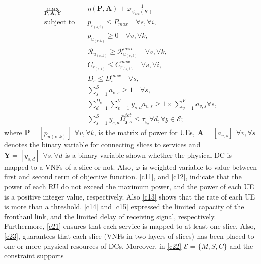 \documentclass[conference]{IEEEtran}
\begin{document}
\begin{subequations}
\begin{alignat}{4}
\max\limits_{\boldsymbol{P}, \boldsymbol{A}, \boldsymbol{Y} }   \quad &  \eta(\boldsymbol{P},\boldsymbol{A})+ \varphi \frac{1}{\psi_{tot}(\boldsymbol{Y})} \\
\text{subject to} \quad  & \bar{p}_{r_{(s,i)}} \leq P_{max} \quad \forall s, \forall i,
 \label{c11} \\
&p_{u_{(v,k)}}  \geq 0  \quad \forall v, \forall k,\label{c12} \\
&\mathcal{R}_{u_{(v,k)}} \geq  \mathcal{R}_{u_{(v,k)}}^{min} \quad \forall v, \forall k,\label{c13} \\
&C_{r_{(s,i)}} \leq C_{r_{(s,i)}}^{max} \quad \forall s, \forall i, \label{c14}\\
&D_{s} \leq D_{s}^{max} \quad \forall s,\label{c15} \\
& \textstyle  \sum_{s=1}^{S}a_{v,s} \geq 1 \quad \forall s, \label{c21} \\
& \textstyle  \sum_{d=1}^{D_c}\sum_{v=1}^{V}y_{s,d}a_{v,s} \geq 1\times\sum_{v=1}^{V}a_{v,s} \forall s,\label{c23} \\
 &\textstyle \sum_{s=1}^{S} y_{s,d} \bar{\Omega}_{\mathfrak{z},s}^{tot}  \leq   \tau_{\mathfrak{z}_d}  \forall d, \forall \mathfrak{z}\in \mathcal{E}; \label{c22}
\end{alignat}
\label{constraints}
\end{subequations}
where $\boldsymbol{P} =[p_{u(v,k)}] \:\: \forall v , \forall k $, is the matrix of power for UEs, $\boldsymbol{A} =[a_{v,s}] \:\: \forall v , \forall s $ denotes the binary variable for connecting slices to services and $\boldsymbol{Y} =[y_{s,d}]  \:\: \forall s ,  \forall d $ is a binary variable shown whether
the physical DC is mapped to a VNFs of a slice or not.
Also, $\varphi$ is weighted variable to value between first and second term of objective function.
\eqref{c11}, and \eqref{c12}, indicate that the power of each RU do not exceed the maximum power, and the power of each UE is a positive integer value, respectively. Also \eqref{c13} shows that the rate of each UE is more than a threshold. \eqref{c14} and \eqref{c15} expressed the limited capacity of the fronthaul link, and the limited delay of receiving signal, respectively.
Furthermore, \eqref{c21}
ensures that each service is mapped to at least one slice.
Also, \eqref{c23}, guarantees that each slice (VNFs in two layers of slices) has been placed to one or more physical resources of DCs. Moreover, in \eqref{c22}  $\mathcal{E} = \{M,S,C\}$ and the constraint supports
\end{document}
